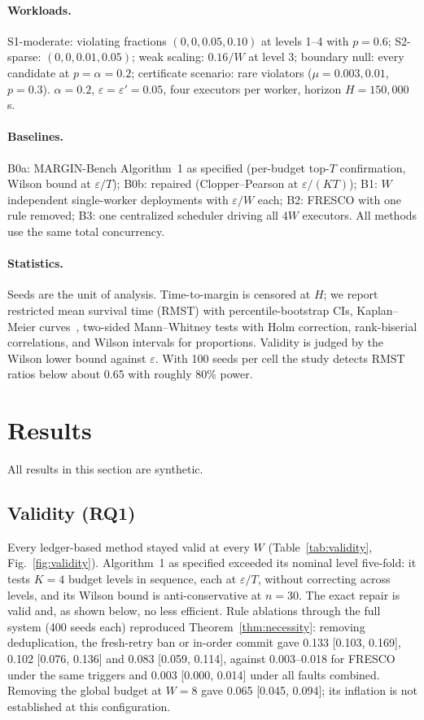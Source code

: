 \documentclass[11pt]{article}
\theoremstyle{definition}
\theoremstyle{remark}
\begin{document}
\paragraph{Workloads.} S1-moderate: violating fractions $(0,0,0.05,0.10)$ at levels 1--4 with $p=0.6$; S2-sparse: $(0,0,0.01,0.05)$; weak scaling: $0.16/W$ at level 3; boundary null: every candidate at $p=\alpha=0.2$; certificate scenario: rare violators ($\mu=0.003,0.01$, $p=0.3$). $\alpha=0.2$, $\varepsilon=\varepsilon'=0.05$, four executors per worker, horizon $H=150{,}000$\,s.

\paragraph{Baselines.} B0a: MARGIN-Bench Algorithm~1 as specified (per-budget top-$T$ confirmation, Wilson bound at $\varepsilon/T$); B0b: repaired (Clopper--Pearson at $\varepsilon/(KT)$); B1: $W$ independent single-worker deployments with $\varepsilon/W$ each; B2: FRESCO with one rule removed; B3: one centralized scheduler driving all $4W$ executors. All methods use the same total concurrency.

\paragraph{Statistics.} Seeds are the unit of analysis. Time-to-margin is censored at $H$; we report restricted mean survival time (RMST) with percentile-bootstrap CIs, Kaplan--Meier curves~\cite{kaplan1958}, two-sided Mann--Whitney tests with Holm correction, rank-biserial correlations, and Wilson intervals for proportions. Validity is judged by the Wilson lower bound against $\varepsilon$. With 100 seeds per cell the study detects RMST ratios below about 0.65 with roughly 80\% power.

\section{Results}\label{sec:results}
All results in this section are synthetic.

\subsection{Validity (RQ1)}
Every ledger-based method stayed valid at every $W$ (Table~\ref{tab:validity}, Fig.~\ref{fig:validity}). Algorithm~1 as specified exceeded its nominal level five-fold: it tests $K=4$ budget levels in sequence, each at $\varepsilon/T$, without correcting across levels, and its Wilson bound is anti-conservative at $n=30$. The exact repair is valid and, as shown below, no less efficient. Rule ablations through the full system (400 seeds each) reproduced Theorem~\ref{thm:necessity}: removing deduplication, the fresh-retry ban or in-order commit gave 0.133 [0.103, 0.169], 0.102 [0.076, 0.136] and 0.083 [0.059, 0.114], against 0.003--0.018 for FRESCO under the same triggers and 0.003 [0.000, 0.014] under all faults combined. Removing the global budget at $W=8$ gave 0.065 [0.045, 0.094]; its inflation is not established at this configuration.
\end{document}
